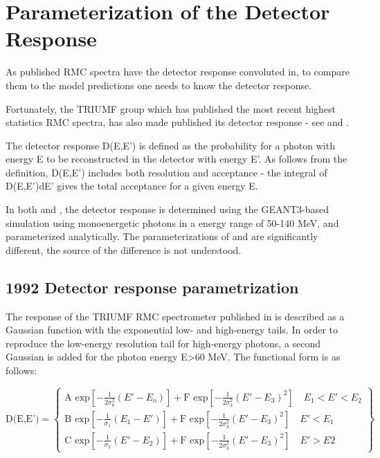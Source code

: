 \section { Parameterization of the Detector Response}

As published RMC spectra have the detector response convoluted in, to compare
them to the model predictions one needs to know the detector response.

Fortunately, the TRIUMF group which has published the most recent highest statistics
RMC spectra, has also made published its detector response -
see \cite{RMC_1992_PhysRevC.46.1094} and \cite{RMC_1998_PhysRevC.58.1767}. 

The detector response D(E,E') is defined as the probability for a photon
with energy E to be reconstructed in the detector with energy E'. As follows from the
definition, D(E,E') includes both resolution and acceptance - the integral of D(E,E')dE'
gives the total acceptance for a given energy E.

In both \cite{RMC_1992_PhysRevC.46.1094} and \cite{RMC_1998_PhysRevC.58.1767}, the
detector response is determined using the GEANT3-based simulation using monoenergetic
photons in a energy range of 50-140 MeV, and parameterized analytically.
The parameterizations of  \cite{RMC_1992_PhysRevC.46.1094} and \cite{RMC_1998_PhysRevC.58.1767}
are significantly different, the source of the difference is not understood.

\subsection { 1992 Detector response parametrization }

The response of the TRIUMF RMC spectrometer published in \cite{RMC_1992_PhysRevC.46.1094}
is described as a Gaussian function with the exponential low- and  high-energy tails.
In order to reproduce the low-energy resolution tail for high-energy photons, a second Gaussian
is added for the photon energy E>60 MeV. The functional form is as follows:

\begin{equation}
  \label{eq:001}
\text{D(E,E')}= \left\{
\begin{array}{ll}
                \text{A exp}\left[-\frac{1}{2\sigma_0^2}(E'-E_o)\right]+
                \text{F exp}\left[-\frac{1}{2\sigma_3^2}(E'-E_3)^2\right]
 \quad E_1<E'<E_2 \\
                \text{B exp}\left[-\frac{1}{\sigma_1}(E_1-E') \right]+
                \text{F exp}\left[-\frac{1}{2\sigma_3^2}(E'-E_3)^2\right]
 \quad E'<E_1      \\  
                \text{C exp}\left[-\frac{1}{\sigma_2}(E'-E_2)\right]+
                \text{F exp}\left[-\frac{1}{2\sigma_3^2}(E'-E_3)^2\right]
 \quad E'>E2     
 \end{array}
 \right\}
\end{equation}
 
